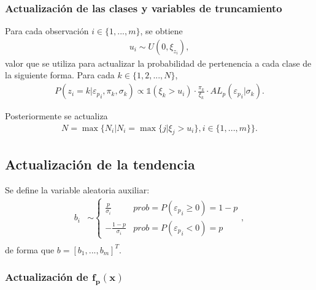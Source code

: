 \subsubsection{Actualizaci\'on de las clases y variables de truncamiento}

Para cada observaci\'on $i \in \{1,...,m\}$, se obtiene
\begin{equation*}
\begin{aligned}
   u_i \sim U(0, \xi_{z_i}),
\end{aligned}
\end{equation*}
valor que se utiliza para actualizar la probabilidad de pertenencia a cada clase de la siguiente forma. Para cada $k \in \{1,2,...,N\}$,
\begin{equation*}
\begin{aligned}
   P(z_i = k| {\varepsilon_p}_i, \pi_k, \sigma_k)
   \propto
   \mathds{1}(\xi_k > u_i)
   \cdot
   \frac{\pi_k}{\xi_k}
   \cdot
   AL_p({\varepsilon_p}_i | \sigma_k).
\end{aligned}
\end{equation*}

Posteriormente se actualiza
\begin{equation*}
\begin{aligned}
   N = \max\{
    N_i|N_i=\max\{j|\xi_j > u_i\}, 
    i \in \{1,...,m\}
   \}.
\end{aligned}
\end{equation*}

\subsection{Actualizaci\'on de la tendencia}

Se define la variable aleatoria auxiliar:
\begin{equation*}
\begin{aligned}
    b_i &\sim 
    \begin{cases}
        \frac{p}{\sigma_i} &prob = P({\varepsilon_p}_i \geq 0) = 1-p\\
        -\frac{1-p}{\sigma_i} &prob = P({\varepsilon_p}_i < 0) = p
    \end{cases},\\
\end{aligned}
\end{equation*}
de forma que $b = [b_1,...,b_m]^T$. 

\subsubsection{Actualizaci\'on de $\bm{f_p(x)}$}

